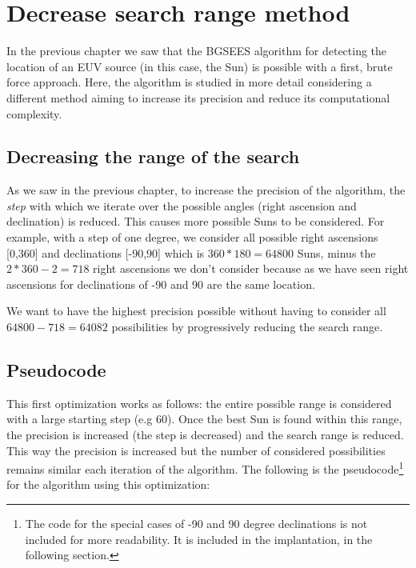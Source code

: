 \chapter{Decrease search range method}

In the previous chapter we saw that the BGSEES algorithm for detecting the location of an EUV source (in this case, the Sun) is possible with a first, brute force approach. Here, the algorithm is studied in more detail considering a different method aiming to increase its precision and reduce its computational complexity.



\section{Decreasing the range of the search}

As we saw in the previous chapter, to increase the precision of the algorithm, the \textit{step} with which we iterate over the possible angles (right ascension and declination) is reduced. This causes more possible Suns to be considered. For example, with a step of one degree, we consider all possible right ascensions [0,360] and declinations [-90,90] which is  $360*180 = 64800$ Suns, minus the $2*360 - 2 = 718$ right ascensions we don't consider because as we have seen right ascensions for declinations of -90 and 90 are the same location.

We want to have the highest precision possible without having to consider all $64800 - 718 = 64082$ possibilities by progressively reducing the search range. 

\section{Pseudocode}

This first optimization works as follows: the entire possible range is considered with a large starting step (e.g 60). Once the best Sun is found within this range, the precision is increased (the step is decreased) and the search range is reduced. This way the precision is increased but the number of considered possibilities remains similar each iteration of the algorithm. The following is the pseudocode\footnote{The code for the special cases of -90 and 90 degree declinations is not included for more readability. It is included in the implantation, in the following section.} for the algorithm using this optimization:

